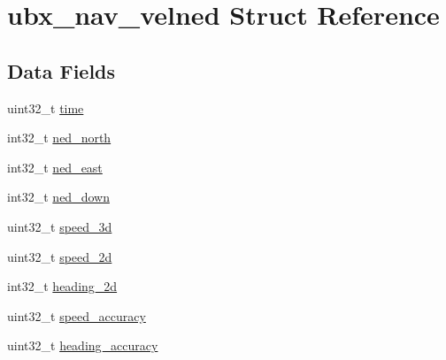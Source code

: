 \hypertarget{structubx__nav__velned}{\section{ubx\+\_\+nav\+\_\+velned Struct Reference}
\label{structubx__nav__velned}
}
\subsection*{Data Fields}
\begin{DoxyCompactItemize}
\item 
uint32\+\_\+t \hyperlink{structubx__nav__velned_a4d24ce209fc4dafbfb4c5c6743113038}{time}
\item 
int32\+\_\+t \hyperlink{structubx__nav__velned_aa7f81d5dc27cbfbccee007a9c3585a34}{ned\+\_\+north}
\item 
int32\+\_\+t \hyperlink{structubx__nav__velned_aa50d2e8676473ad0fa5383ab9c839b8d}{ned\+\_\+east}
\item 
int32\+\_\+t \hyperlink{structubx__nav__velned_a17af731dd9b12e1b7beb733f4aae981c}{ned\+\_\+down}
\item 
uint32\+\_\+t \hyperlink{structubx__nav__velned_ac82f3deea46466151bab94b968197120}{speed\+\_\+3d}
\item 
uint32\+\_\+t \hyperlink{structubx__nav__velned_a7894e2dd765ad10917f46b5d9d730e49}{speed\+\_\+2d}
\item 
int32\+\_\+t \hyperlink{structubx__nav__velned_a0c7bc357ef18376836a95b06c248810a}{heading\+\_\+2d}
\item 
uint32\+\_\+t \hyperlink{structubx__nav__velned_ae89d7e1b350096180d962c50438c9e2e}{speed\+\_\+accuracy}
\item 
uint32\+\_\+t \hyperlink{structubx__nav__velned_abf6877fc3ba435d7d3369c2a6c40ee7f}{heading\+\_\+accuracy}
\end{DoxyCompactItemize}


